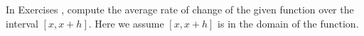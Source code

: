 {\noindent In Exercises}
{, compute the average rate of change of the given function over the interval $[x, x + h]$.  Here we assume $[x, x + h]$ is in the domain of the function.
}

